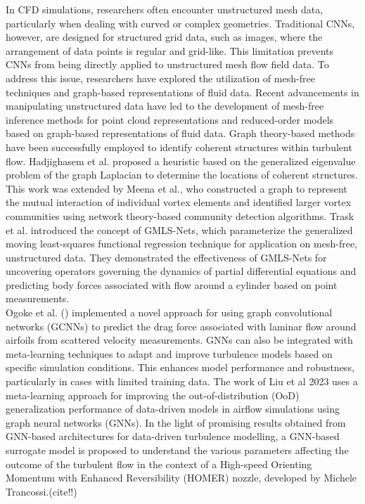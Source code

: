 In CFD simulations, researchers often encounter unstructured mesh data, particularly when dealing with curved or complex geometries. Traditional CNNs, however, are designed for structured grid data, such as images, where the arrangement of data points is regular and grid-like. This limitation prevents CNNs from being directly applied to unstructured mesh flow field data. To address this issue, researchers have explored the utilization of mesh-free techniques and graph-based representations of fluid data. Recent advancements in manipulating unstructured data have led to the development of mesh-free inference methods for point cloud representations and reduced-order models based on graph-based representations of fluid data. Graph theory-based methods have been successfully employed to identify coherent structures within turbulent flow. Hadjighasem et al. proposed a heuristic based on the generalized eigenvalue problem of the graph Laplacian to determine the locations of coherent structures. This work was extended by Meena et al., who constructed a graph to represent the mutual interaction of individual vortex elements and identified larger vortex communities using network theory-based community detection algorithms. Trask et al. introduced the concept of GMLS-Nets, which parameterize the generalized moving least-squares functional regression technique for application on mesh-free, unstructured data. They demonstrated the effectiveness of GMLS-Nets for uncovering operators governing the dynamics of partial differential equations and predicting body forces associated with flow around a cylinder based on point measurements. \\ %
Ogoke et al. () implemented a novel approach for using graph convolutional networks (GCNNs) to predict the drag force associated with laminar flow around airfoils from scattered velocity measurements. GNNs can also be integrated with meta-learning techniques to adapt and improve turbulence models based on specific simulation conditions. This enhances model performance and robustness, particularly in cases with limited training data. The work of Liu et al 2023 uses a meta-learning approach for improving the out-of-distribution (OoD) generalization performance of data-driven models in airflow simulations using graph neural networks (GNNs). In the light of promising results obtained from GNN-based architectures for data-driven turbulence modelling, a GNN-based surrogate model is proposed to understand the various parameters affecting the outcome of the turbulent flow in the context of a High-speed Orienting Momentum with Enhanced Reversibility (HOMER) nozzle, developed by Michele Trancossi.(cite!!)

